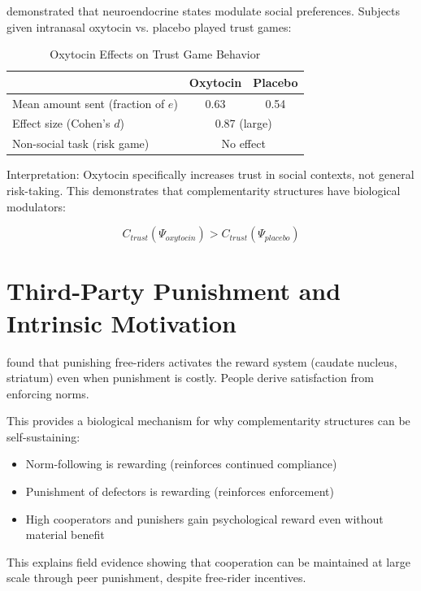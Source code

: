 \documentclass[12pt,oneside]{book}
\begin{document}
\citet{kosfeld2005} demonstrated that neuroendocrine states modulate social preferences. Subjects
given intranasal oxytocin vs. placebo played trust games:

\begin{table}[htbp]
\centering
\caption{Oxytocin Effects on Trust Game Behavior}
\label{tab:oxytocin}
\begin{tabular}{@{}lcc@{}}
\toprule
& \textbf{Oxytocin} & \textbf{Placebo} \\
\midrule
Mean amount sent (fraction of $e$) & 0.63 & 0.54 \\
Effect size (Cohen's $d$)          & \multicolumn{2}{c}{0.87 (large)} \\
Non-social task (risk game)        & \multicolumn{2}{c}{No effect} \\
\bottomrule
\end{tabular}
\end{table}

Interpretation: Oxytocin specifically increases trust in social contexts, not general risk-taking.
This demonstrates that complementarity structures have biological modulators:

\begin{equation}
C_{trust}(\Psi_{oxytocin}) > C_{trust}(\Psi_{placebo})
\end{equation}

\section{Third-Party Punishment and Intrinsic Motivation}

\citet{dequervain2004} found that punishing free-riders activates the reward system (caudate
nucleus, striatum) even when punishment is costly. People derive satisfaction from enforcing norms.

This provides a biological mechanism for why complementarity structures can be self-sustaining:
\begin{itemize}
  \item Norm-following is rewarding (reinforces continued compliance)
  \item Punishment of defectors is rewarding (reinforces enforcement)
  \item High cooperators and punishers gain psychological reward even without material benefit
\end{itemize}

This explains field evidence showing that cooperation can be maintained at large scale through
peer punishment, despite free-rider incentives.
\end{document}
